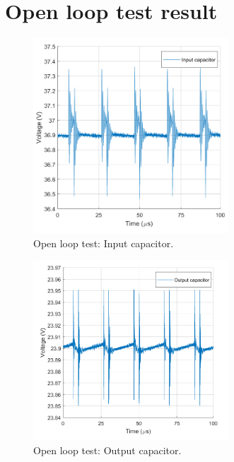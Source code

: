 \chapter{Open loop test result} \label{appopenloop} 

\begin{figure}[H]
\begin{center}
	\includegraphics[width=0.65\textwidth]{../Pictures/P1/Test/Openloopinputcapacitor}
	\caption{Open loop test: Input capacitor.}
	\label{Openlooptestinputcapacitor}
\end{center}	
\end{figure}

\begin{figure}[H]
\begin{center}
	\includegraphics[width=0.65\textwidth]{../Pictures/P1/Test/Openloopoutputcapacitor}
	\caption{Open loop test: Output capacitor.}
	\label{Openlooptestoutputtcapacitor}
\end{center}	
\end{figure}